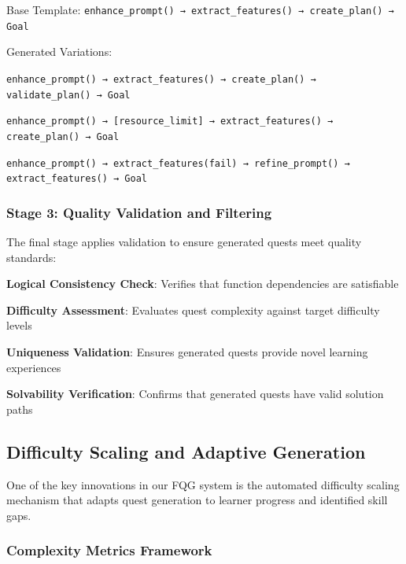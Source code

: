 \begin{infobox}[title=Example: Variation Generation Process]
Base Template: \texttt{enhance\_prompt() → extract\_features() → create\_plan() → Goal}

Generated Variations:
\begin{compactlist}
    \item \texttt{enhance\_prompt() → extract\_features() → create\_plan() → validate\_plan() → Goal}
    \item \texttt{enhance\_prompt() → [resource\_limit] → extract\_features() → create\_plan() → Goal}
    \item \texttt{enhance\_prompt() → extract\_features(fail) → refine\_prompt() → extract\_features() → Goal}
\end{compactlist}
\end{infobox}

\subsubsection*{Stage 3: Quality Validation and Filtering}

The final stage applies validation to ensure generated quests meet quality standards:

\begin{expandedlist}
    \item \textbf{Logical Consistency Check}: Verifies that function dependencies are satisfiable
    \item \textbf{Difficulty Assessment}: Evaluates quest complexity against target difficulty levels
    \item \textbf{Uniqueness Validation}: Ensures generated quests provide novel learning experiences
    \item \textbf{Solvability Verification}: Confirms that generated quests have valid solution paths
\end{expandedlist}

\subsection*{Difficulty Scaling and Adaptive Generation}

One of the key innovations in our FQG system is the automated difficulty scaling mechanism that adapts quest generation to learner progress and identified skill gaps.

\subsubsection*{Complexity Metrics Framework}

